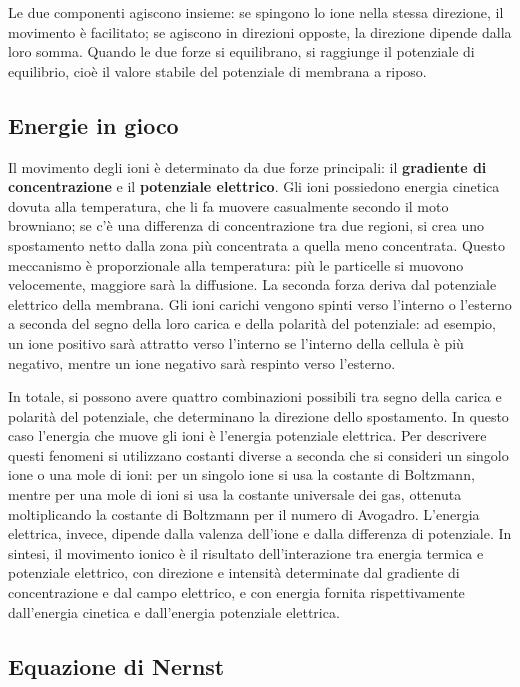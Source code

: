 Le due componenti agiscono insieme: se spingono lo ione nella stessa direzione, il movimento è facilitato; se agiscono in direzioni opposte, la direzione dipende dalla loro somma. Quando le due forze si equilibrano, si raggiunge il potenziale di equilibrio, cioè il valore stabile del potenziale di membrana a riposo.


\subsection{Energie in gioco}

Il movimento degli ioni è determinato da due forze principali: il \textbf{gradiente di concentrazione }e il \textbf{potenziale elettrico}.
Gli ioni possiedono energia cinetica dovuta alla temperatura, che li fa muovere casualmente secondo il moto browniano; se c'è una differenza di concentrazione tra due regioni, si crea uno spostamento netto dalla zona più concentrata a quella meno concentrata. Questo meccanismo è proporzionale alla temperatura: più le particelle si muovono velocemente, maggiore sarà la diffusione.
La seconda forza deriva dal potenziale elettrico della membrana. Gli ioni carichi vengono spinti verso l'interno o l'esterno a seconda del segno della loro carica e della polarità del potenziale: ad esempio, un ione positivo sarà attratto verso l'interno se l'interno della cellula è più negativo, mentre un ione negativo sarà respinto verso l'esterno.

In totale, si possono avere quattro combinazioni possibili tra segno della carica e polarità del potenziale, che determinano la direzione dello spostamento. In questo caso l'energia che muove gli ioni è l'energia potenziale elettrica.
Per descrivere questi fenomeni si utilizzano costanti diverse a seconda che si consideri un singolo ione o una mole di ioni: per un singolo ione si usa la costante di Boltzmann, mentre per una mole di ioni si usa la costante universale dei gas, ottenuta moltiplicando la costante di Boltzmann per il numero di Avogadro. L'energia elettrica, invece, dipende dalla valenza dell'ione e dalla differenza di potenziale.
In sintesi, il movimento ionico è il risultato dell'interazione tra energia termica e potenziale elettrico, con direzione e intensità determinate dal gradiente di concentrazione e dal campo elettrico, e con energia fornita rispettivamente dall'energia cinetica e dall'energia potenziale elettrica.


\subsection{Equazione di Nernst}

